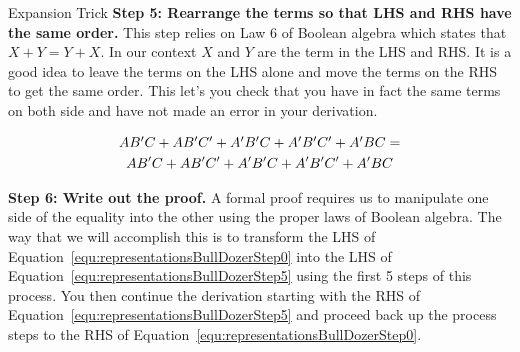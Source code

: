 \begin{process}{Expansion Trick}
\textbf{Step 5: Rearrange the terms so that LHS and RHS have the same order.}
This step relies on Law 6 of Boolean algebra which states that $X+Y = Y+X$.  In our
context $X$ and $Y$ are the term in the LHS and RHS.  It is a good idea to leave the terms
on the LHS alone and move the terms on the RHS to get the same order.  This let's you check
that you have in fact the same terms on both side and have not made an error in your derivation.

\begin{multline}
\label{equ:representationsBullDozerStep5}
$$ AB'C + AB'C' + A'B'C + A'B'C' + A'BC =  \\
AB'C + AB'C' + A'B'C + A'B'C' + A'BC$$
\end{multline}

\textbf{Step 6: Write out the proof.}
A formal proof requires us to manipulate one side of the equality into the
other using the proper laws of Boolean algebra.  The way that we will accomplish
this is to transform the LHS of Equation~\ref{equ:representationsBullDozerStep0} into
the LHS of Equation~\ref{equ:representationsBullDozerStep5}
using the first 5 steps of this process.   You then continue the derivation starting
with the RHS of Equation~\ref{equ:representationsBullDozerStep5} and proceed
back up the process steps to the RHS of Equation~\ref{equ:representationsBullDozerStep0}.


\end{process}
